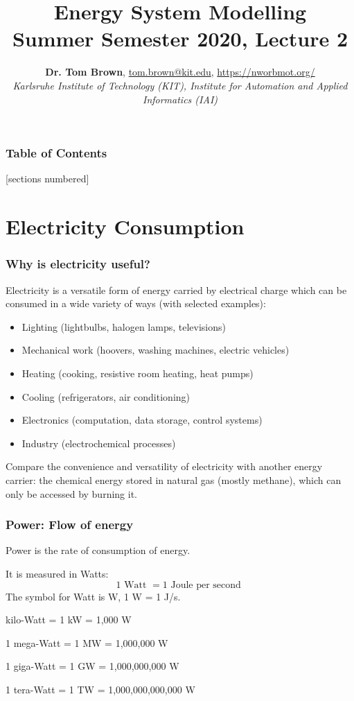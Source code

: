 \documentclass[10pt,aspectratio=169,dvipsnames]{beamer}
\title{Energy System Modelling\\ Summer Semester 2020, Lecture 2}
\author{
  {\bf Dr. Tom Brown}, \href{mailto:tom.brown@kit.edu}{tom.brown@kit.edu}, \url{https://nworbmot.org/}\\
  \emph{Karlsruhe Institute of Technology (KIT), Institute for Automation and Applied Informatics (IAI)}
}
\date{}
\let\olditem\item
\renewcommand{\item}{%
\olditem\vspace{5pt}}
\begin{document}
\maketitle


\begin{frame}

  \frametitle{Table of Contents}
  [sections numbered]
  \tableofcontents[hideallsubsections]
\end{frame}



\section{Electricity Consumption}

\begin{frame}
  \frametitle{Why is electricity useful?}

  Electricity is a versatile form of energy carried by electrical
  charge which can be consumed in a wide variety of ways (with selected examples):
  \begin{itemize}
  \item Lighting (lightbulbs, halogen lamps, televisions)
  \item Mechanical work (hoovers, washing machines, electric vehicles)
  \item Heating (cooking, resistive room heating, heat pumps)
  \item Cooling (refrigerators, air conditioning)
  \item Electronics (computation, data storage, control systems)
  \item Industry (electrochemical processes)
  \end{itemize}

  Compare the convenience and versatility of electricity with another
  energy carrier: the chemical energy stored in natural gas (mostly methane),
  which can only be accessed by burning it.

\end{frame}



\begin{frame}
  \frametitle{Power: Flow of energy}

  \alert{Power} is the rate of consumption of energy.

  It is measured in \alert{Watts}:
  \begin{equation*}
     1 \textrm{ Watt } = 1 \textrm{ Joule per second }
  \end{equation*}
  The symbol for Watt is W, 1 W = 1 J/s.

   kilo-Watt = 1 kW = 1,000 W

  1 mega-Watt = 1 MW = 1,000,000 W

  1 giga-Watt = 1 GW = 1,000,000,000 W

  1 tera-Watt = 1 TW = 1,000,000,000,000 W


\end{frame}
\end{document}
